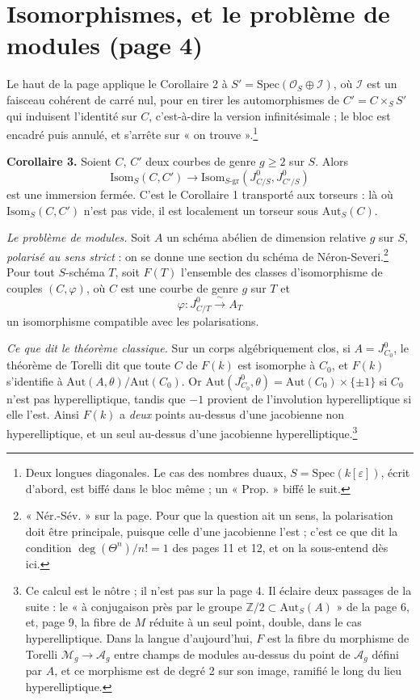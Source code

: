 \documentclass[11pt,a4paper]{article}
\begin{document}
\section*{Isomorphismes, et le problème de modules (page 4)}

Le haut de la page applique le Corollaire 2 à
$S' = \mathrm{Spec}(\mathcal{O}_{S} \oplus \mathcal{I})$, où $\mathcal{I}$
est un faisceau cohérent de carré nul, pour en tirer les automorphismes de
$C' = C \times_{S} S'$ qui induisent l'identité sur $C$, c'est-à-dire la version
infinitésimale ; le bloc est encadré puis annulé, et s'arrête sur « on
trouve ».\footnote{Deux longues diagonales. Le cas des nombres duaux,
$S = \mathrm{Spec}(k[\varepsilon])$, écrit d'abord, est biffé dans le bloc
même ; un « Prop. » biffé le suit.}

\textbf{Corollaire 3.} Soient $C$, $C'$ deux courbes de genre $g \geq 2$ sur
$S$. Alors
\[
  \mathrm{Isom}_{S}(C, C') \longrightarrow
  \mathrm{Isom}_{S\text{-gr}}(J^{0}_{C/S}, J^{0}_{C'/S})
\]
est une immersion fermée. C'est le Corollaire 1 transporté aux torseurs : là où
$\mathrm{Isom}_{S}(C, C')$ n'est pas vide, il est localement un torseur sous
$\mathrm{Aut}_{S}(C)$.

\emph{Le problème de modules.} Soit $A$ un schéma abélien de dimension relative
$g$ sur $S$, \emph{polarisé au sens strict} : on se donne une section du schéma
de Néron-Severi.\footnote{« Nér.-Sév. » sur la page. Pour que la question ait
un sens, la polarisation doit être principale, puisque celle d'une jacobienne
l'est ; c'est ce que dit la condition $\deg(\Theta^{n})/n! = 1$ des pages 11 et
12, et on la sous-entend dès ici.} Pour tout $S$-schéma $T$, soit $F(T)$
l'ensemble des classes d'isomorphisme de couples $(C, \varphi)$, où $C$ est une
courbe de genre $g$ sur $T$ et
\[
  \varphi : J^{0}_{C/T} \xrightarrow{\;\sim\;} A_{T}
\]
un isomorphisme compatible avec les polarisations.

\emph{Ce que dit le théorème classique.} Sur un corps algébriquement clos, si
$A = J^{0}_{C_{0}}$, le théorème de Torelli dit que toute $C$ de $F(k)$ est
isomorphe à $C_{0}$, et $F(k)$ s'identifie à
$\mathrm{Aut}(A, \theta)/\mathrm{Aut}(C_{0})$. Or
$\mathrm{Aut}(J^{0}_{C_{0}}, \theta) = \mathrm{Aut}(C_{0}) \times \{\pm 1\}$
si $C_{0}$ n'est pas hyperelliptique, tandis que $-1$ provient de l'involution
hyperelliptique si elle l'est. Ainsi $F(k)$ a \emph{deux} points au-dessus
d'une jacobienne non hyperelliptique, et un seul au-dessus d'une jacobienne
hyperelliptique.\footnote{Ce calcul est le nôtre ; il n'est pas sur la page 4.
Il éclaire deux passages de la suite : le « à conjugaison près par le groupe
$\mathbb{Z}/2 \subset \mathrm{Aut}_{S}(A)$ » de la page 6, et, page 9, la
fibre de $M$ réduite à un seul point, double, dans le cas hyperelliptique.
Dans la langue d'aujourd'hui, $F$ est la fibre du morphisme
de Torelli $\mathcal{M}_{g} \to \mathcal{A}_{g}$ entre champs de modules
au-dessus du point de $\mathcal{A}_{g}$ défini par $A$, et ce morphisme est de
degré 2 sur son image, ramifié le long du lieu hyperelliptique.}
\end{document}
